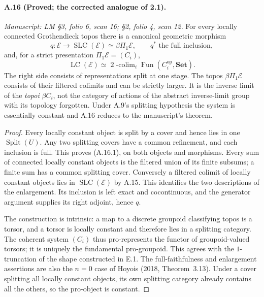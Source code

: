 \paragraph{A.16 (Proved; the corrected analogue of 2.1).}
\textit{Manuscript: LM \S3, folio 6, scan 16; \S2, folio 4, scan 12.}
For every locally connected Grothendieck topos there is a canonical geometric morphism
\[
 q:\mathcal E\longrightarrow\operatorname{SLC}(\mathcal E)
       \simeq\beta\Pi_1\mathcal E,
 \qquad q^*\text{ the full inclusion},
\]
and, for a strict presentation $\Pi_1\mathcal E=(C_i)$,
\[
 \operatorname{LC}(\mathcal E)
   \simeq\mathop{\mathrm{2\!\!\!-colim}}_i
       \operatorname{Fun}(C_i^{\mathrm{op}},\mathbf{Set}).
                                                        \tag{A.16.1}
\]
The right side consists of representations split at one stage. The topos $\beta\Pi_1\mathcal E$ consists of their filtered colimits and can be strictly larger. It is the inverse limit of the \emph{topoi} $\beta C_i$, not the category of actions of the abstract inverse-limit group with its topology forgotten. Under A.9's splitting hypothesis the system is essentially constant and A.16 reduces to the manuscript's theorem.
\begin{proof}
Every locally constant object is split by a cover and hence lies in one $\operatorname{Split}(U)$. Any two splitting covers have a common refinement, and each inclusion is full. This proves (A.16.1), on both objects and morphisms. Every sum of connected locally constant objects is the filtered union of its finite subsums; a finite sum has a common splitting cover. Conversely a filtered colimit of locally constant objects lies in $\operatorname{SLC}(\mathcal E)$ by A.15. This identifies the two descriptions of the enlargement. Its inclusion is left exact and cocontinuous, and the generator argument supplies its right adjoint, hence $q$.

The construction is intrinsic: a map to a discrete groupoid classifying topos is a torsor, and a torsor is locally constant and therefore lies in a splitting category. The coherent system $(C_i)$ thus pro-represents the functor of groupoid-valued torsors; it is uniquely the fundamental pro-groupoid. This agrees with the $1$-truncation of the shape constructed in E.1. The full-faithfulness and enlargement assertions are also the $n=0$ case of Hoyois (2018, Theorem~3.13). Under a cover splitting all locally constant objects, its own splitting category already contains all the others, so the pro-object is constant. 
\end{proof}


